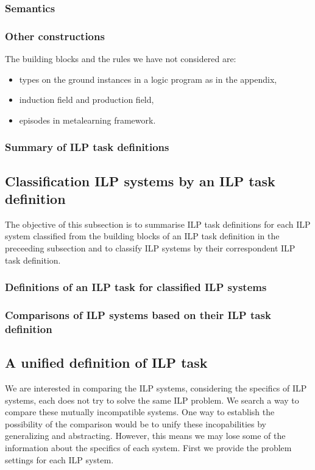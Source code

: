 \subsubsection{Semantics}

\subsubsection{Other constructions}
The building blocks and the rules we have not considered are:
\begin{itemize}
\item types on the ground instances in a logic program as in the appendix,
\item induction field\cite{yamamoto2012inverse} and production field\cite{inoue2004induction},
\item episodes in metalearning framework\cite{muggleton2013meta}.
\end{itemize}

\subsubsection{Summary of ILP task definitions}

\subsection{Classification ILP systems by an ILP task definition}
The objective of this subsection is to summarise ILP task definitions for each ILP system classified from the building blocks of an ILP task definition in the preceeding subsection  and to classify ILP systems by their correspondent ILP task definition.

\subsubsection{Definitions of an ILP task for classified ILP systems}

\subsubsection{Comparisons of ILP systems based on their ILP task definition}

\subsection{A unified definition of ILP task}
We are interested in comparing the ILP systems, considering the specifics of ILP systems, each does not try to solve the same ILP problem. We search a way to compare these mutually incompatible systems. One way to establish the possibility of the comparison would be to unify these incopabilities by generalizing and abstracting. However, this means we may lose some of the information about the specifics of each system. First we provide the problem settings for each ILP system.


